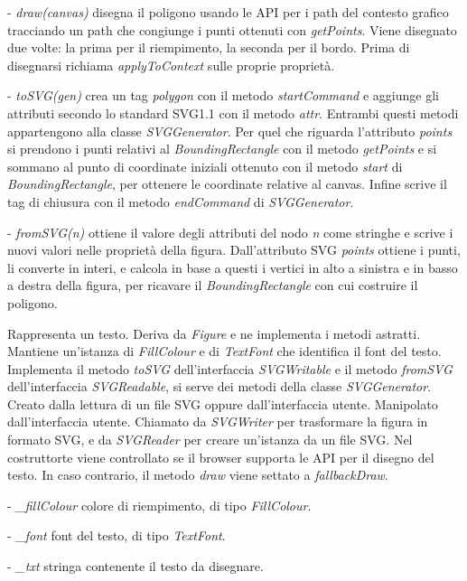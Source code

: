 \begin{elencopuntato}[\subsubsecindent]
\item[-] \textit{draw(canvas)} disegna il poligono usando le API per i path del contesto grafico tracciando  un path che congiunge i punti ottenuti con \textit{getPoints}. Viene disegnato due volte: la prima per il riempimento, la seconda per il bordo. Prima di disegnarsi richiama \textit{applyToContext} sulle proprie propriet\`a.
\item[-] \textit{toSVG(gen)} crea un tag \textit{polygon} con il metodo \textit{startCommand} e aggiunge gli attributi secondo lo standard SVG1.1 con il metodo \textit{attr}. Entrambi questi metodi appartengono alla classe \textit{SVGGenerator}. Per quel che riguarda l'attributo \textit{points} si prendono i punti relativi al \textit{BoundingRectangle} con il metodo \textit{getPoints} e si sommano al punto di coordinate iniziali ottenuto con il metodo \textit{start} di \textit{BoundingRectangle}, per ottenere le coordinate relative al canvas. Infine scrive il tag di chiusura con il metodo \textit{endCommand} di \textit{SVGGenerator}.
\item[-] \textit{fromSVG(n)} ottiene il valore degli attributi del nodo \textit{n} come stringhe e scrive i nuovi valori nelle propriet\`a della figura. Dall'attributo SVG \textit{points} ottiene i punti, li converte in interi, e calcola in base a questi i vertici in alto a sinistra e in basso a destra della figura, per ricavare il \textit{BoundingRectangle} con cui costruire il poligono. 
\end{elencopuntato}

Rappresenta un testo.
Deriva da \textit{Figure} e ne implementa i metodi astratti. Mantiene un'istanza di \textit{FillColour} e di \textit{TextFont} che identifica il font del testo. Implementa il metodo \textit{toSVG} dell'interfaccia \textit{SVGWritable} e il metodo \textit{fromSVG} dell'interfaccia \textit{SVGReadable}, si serve dei metodi della classe \textit{SVGGenerator}.
Creato dalla lettura di un file SVG oppure dall'interfaccia utente. Manipolato dall'interfaccia utente. Chiamato da \textit{SVGWriter} per trasformare la figura in formato SVG, e da \textit{SVGReader} per creare un'istanza da un file SVG.
Nel costruttorte viene controllato se il browser supporta le API per il disegno del testo. In caso contrario, il metodo \textit{draw} viene settato a \textit{fallbackDraw}.
\begin{elencopuntato}[\subsubsecindent]
\item[-] \textit{{\_}fillColour} colore di riempimento, di tipo \textit{FillColour}.
\item[-] \textit{{\_}font} font del testo, di tipo \textit{TextFont}.
\item[-] \textit{{\_}txt} stringa contenente il testo da disegnare.
\end{elencopuntato}
